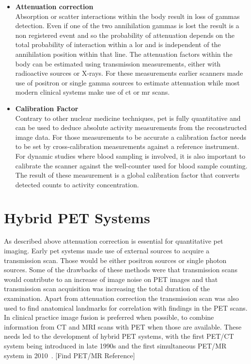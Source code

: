 \begin{itemize}
\item\textbf{Attenuation correction}\\
Absorption or scatter interactions within the body result in loss of gammas detection. Even if one of the two annihilation gammas is lost the result is a non registered event and so the probability of attenuation depends on the total probability of interaction within a \gls{lor} and is independent of the annihilation position within that line. The attenuation factors within the body can be estimated using transmission measurements, either with radioactive sources or X-rays. For these measurements earlier scanners made use of positron or single gamma sources to estimate attenuation while most modern clinical systems make use of \gls{ct} or \gls{mr} scans. 
\item\textbf{Calibration Factor}\\
Contrary to other nuclear medicine techniques, \gls{pet} is fully quantitative and can be used to deduce absolute activity measurements from the reconstructed image data. For those measurements to be accurate a calibration factor needs to be set by cross-calibration measurements against a reference instrument. For dynamic studies where blood sampling is involved, it is also important to calibrate the scanner against the well-counter used for blood sample counting. The result of these measurement is a global calibration factor that converts detected counts to activity concentration. 
\end{itemize}


\section{Hybrid PET Systems}
As described above attenuation correction is essential for quantitative \gls{pet} imaging. Early \gls{pet} systems made use of external sources to acquire a transmission scan. Those would be either positron sources or single photon sources. Some of the drawbacks of these methods were that transmission scans would contribute to an increase of image noise on PET images and that transmission scan acquisition was increasing the total duration of the examination. 
Apart from attenuation correction the transmission scan was also used to find anatomical landmarks for correlation with findings in the PET scans. In clinical practice image fusion is preferred when possible, to combine information from CT and MRI scans with PET when those are available. 
These needs led to the development of hybrid PET systems, with the first PET/CT system being introduced in late 1990s and the first simultaneous PET/MR system in 2010~\cite{Townsend2008}. [Find PET/MR Reference]

